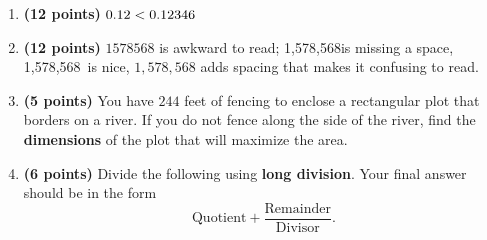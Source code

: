 \documentclass[12pt]{amsart}
\begin{document}
\begin{enumerate}
\item {\bf (12 points)} 
 $\atwofive < \btwofive$ 
\vfill 
\def \a{7}\def \atwoone{1}\def \atwotwo{-2}\def \atwothree{5}\def \btwothree{9}\def \sumtwothree{14}\def \diftwothree{-4}\def \bigtwothree{500}\def \powtwothree{59049}\def \logtwothree{0.7324867603589634}\def \factortwothree{95}\def \atwofour{1.47}\def \btwofour{1.849}\def \tooshorttwofour{10.1}\def \moneytwofour{10.10}\def \longertwofour{10.10000}\def \atwofive{0.12}\def \btwofive{0.12346}\def \athreeone{6}\def \bthreeone{4}\def \setthreetwo{[3, 7, 7]}\def \athreetwo{3}\def \bthreetwo{7}\def \cthreetwo{7}\def \controlthreethree{-4}\def \athreethree{2}\def \topthreethree{0}\def \athreefour{5}\def \bthreefour{4}\def \listthreefour{[1, 2, 3, 4]}\def \afourone{4}\def \bfourone{-8}\def \fracfourone{\frac{-1}{2}}\def \rootfourtwo{12}\def \simplifiedfourtwo{2 \sqrt{3}}\def \sqrtlistfourtwo{[2, 3]}\def \outfourtwo{2}\def \infourtwo{3}\def \wowfourtwo{1}\def \afourthree{5}\def \nicethreefour{3x^{2}-x^{}+5}\def \nastythreefour{xyz^{3}+5}\def \cfourthree{4}\def \dfourthree{10}\def \infourthree{4x^{}}\def \outfourthree{+10y^{}}\def \afourfour{1578568}\def \nicefourfour{1,578,568}\def \goodfourfour{1,000,000.12345}\def \badfourfour{1,000,000.1}
\item {\bf (12 points)} 
 $\afourfour$ is awkward to read; \nicefourfour is missing a space, \nicefourfour\ is nice, $\nicefourfour$ adds spacing that makes it confusing to read. 
\vfill 
\newpage\def \x{61}\def \y{122}\def \L{244}\def \area{7442}
\item {\bf (5 points)} 
 You have $\L$ feet of fencing to enclose a rectangular plot that borders on a river. If you do not fence along the side of the river, find the \textbf{dimensions} of the plot that will maximize the area. \\

  
\vfill \vfill \vfill
\def \a{7}\def \b{2}\def \c{-6}\def \r{14}\def \monicpol{x^{}+7}\def \longnbad{2x^{2}+8x^{}-28}\def \anspol{2x^{}-6}
\item {\bf (6 points)} 
 Divide the following using {\bf long division}. Your final answer should be in the form $$ \text{Quotient} + \dfrac{\text{Remainder}}{\text{Divisor}}.$$


\end{enumerate}
\end{document}
